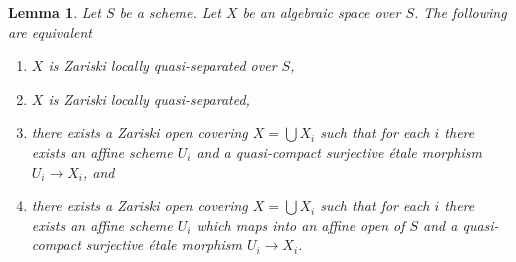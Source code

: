 \documentclass[10pt,a4paper]{amsart}
\theoremstyle{plain}
\newtheorem{lemma}[subsection]{Lemma}
\theoremstyle{definition}
\theoremstyle{remark}
\numberwithin{equation}{subsection}
\begin{document}
\begin{lemma}
\label{lemma-quasi-separated-quasi-compact-pieces}
Let $S$ be a scheme.
Let $X$ be an algebraic space over $S$.
The following are equivalent
\begin{enumerate}
\item $X$ is Zariski locally quasi-separated over $S$,
\item $X$ is Zariski locally quasi-separated,
\item there exists a Zariski open covering $X = \bigcup X_i$
such that for each $i$ there exists an affine scheme
$U_i$ and a quasi-compact surjective \'etale
morphism $U_i \to X_i$, and
\item there exists a Zariski open covering $X = \bigcup X_i$
such that for each $i$ there exists an affine scheme
$U_i$ which maps into an affine open of $S$ and a quasi-compact
surjective \'etale morphism $U_i \to X_i$.
\end{enumerate}
\end{lemma}
\end{document}
